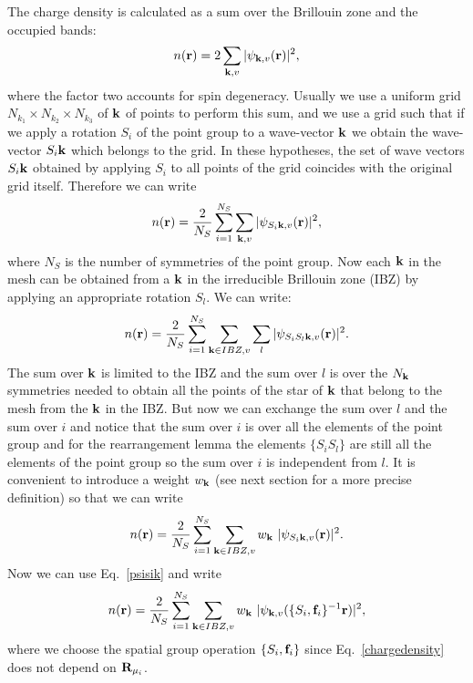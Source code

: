 \documentclass[12pt,a4paper,twoside]{report}
\begin{document}
The charge density is calculated as a sum over the
Brillouin zone and the occupied bands:
\begin{equation}
n({\bf r}) = 2 \sum_{{\bf k}, v} |\psi_{{\bf k}, v} ({\bf r}) |^2,
\end{equation}
where the factor two accounts for spin degeneracy.
Usually we use a uniform grid $N_{k_1}\times N_{k_2} \times N_{k_3}$ of ${\bf k}$ of points to perform this sum, and we use a grid such that if we apply a rotation $S_i$ of the point group to a wave-vector ${\bf k}$ we obtain the wave-vector $S_i {\bf k}$ which belongs to the grid. 
In these hypotheses, the set of wave vectors $S_i {\bf k}$ obtained by applying $S_i$ to all points of the grid
coincides with the original grid itself. Therefore we 
can write 
\begin{equation}
n({\bf r}) = {2 \over N_S} \sum_{i=1}^{N_S} \sum_{{\bf k}, v} |\psi_{S_i{\bf k}, v} ({\bf r}) |^2,
\end{equation}
where $N_S$ is the number of symmetries of the point group. Now each ${\bf k}$ in the mesh can be obtained from a ${\bf k}$ in the irreducible Brillouin zone (IBZ) by applying an appropriate rotation $S_l$.
We can write:
\begin{equation}
n({\bf r}) = {2 \over N_S} \sum_{i=1}^{N_S} \sum_{{\bf k} \in IBZ, v} \sum_l |\psi_{S_iS_l{\bf k}, v} ({\bf r}) |^2.
\end{equation}
The sum over ${\bf k}$ is limited to the IBZ and the sum over $l$ is over the $N_{\bf k}$ symmetries needed to obtain all the points of the star of ${\bf k}$ that belong to the mesh from the 
${\bf k}$ in the IBZ. But now we can exchange the sum over $l$ and the sum over $i$ and notice that the sum over $i$ is over all the elements of the point group and for the rearrangement lemma the elements $\{ S_i S_l\}$ are still all the elements of the point group so the sum over $i$ is independent from $l$. It is convenient to introduce
a weight $w_{\bf k}$ (see next section for a more precise definition) 
so that we can write
\begin{equation}
n({\bf r}) = {2 \over N_S} \sum_{i=1}^{N_S}  \sum_{{\bf k} \in IBZ, v} w_{\bf k}\ |\psi_{S_i{\bf k}, v} ({\bf r}) |^2.
\label{charge_density}
\end{equation}
Now we can use Eq.~\ref{psisik} and write
\begin{equation}
n({\bf r}) = {2 \over N_S} \sum_{i=1}^{N_S} \sum_{{\bf k}\in IBZ , v} w_{\bf k}\ |\psi_{{\bf k}, v} ( \{S_i,{\bf f}_i\}^{-1} {\bf r}) |^2,
\label{chargedensity}
\end{equation}
where we choose the spatial group operation $\{S_i,{\bf f}_i\}$ since Eq.~\ref{chargedensity} does not depend on
${\bf R}_{\mu_i}$.
\end{document}
